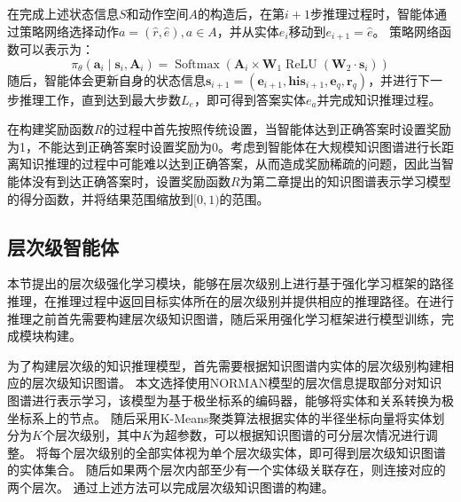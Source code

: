 \documentclass[algorithmlist, AutoFakeBold, AutoFakeSlant, figurelist, tablelist, nomlist, engineering]{seuthesix}
\begin{document}
在完成上述状态信息$S$和动作空间$A$的构造后，在第$i+1$步推理过程时，智能体通过策略网络选择动作$a = (\hat{r}, \hat{e}), a \in A$，并从实体$e_i$移动到$e_{i+1} = \hat{e}$。
策略网络函数可以表示为：
\begin{equation}
  \pi_\theta\left(\bm{a}_i \mid \bm{s}_i, \bm{A}_i\right) =\operatorname{Softmax}\left(\bm{A}_i \times \mathbf{W}_1 \operatorname{ReLU}\left(\mathbf{W}_2 \cdot \bm{s}_i\right)\right)
  \label{aaaaa}
\end{equation}
随后，智能体会更新自身的状态信息$\bm{s}_{i+1} = (\bm{e}_{i+1}, \bm{his}_{i+1}, \bm{e}_q, \bm{r}_q)$，并进行下一步推理工作，直到达到最大步数$L_e$，即可得到答案实体$e_a$并完成知识推理过程。

在构建奖励函数$R$的过程中首先按照传统设置，当智能体达到正确答案时设置奖励为1，不能达到正确答案时设置奖励为0。考虑到智能体在大规模知识图谱进行长距离知识推理的过程中可能难以达到正确答案，从而造成奖励稀疏的问题，因此当智能体没有到达正确答案时，设置奖励函数$R$为第二章提出的知识图谱表示学习模型的得分函数，并将结果范围缩放到$[0, 1)$的范围。

\subsection{层次级智能体}
本节提出的层次级强化学习模块，能够在层次级别上进行基于强化学习框架的路径推理，在推理过程中返回目标实体所在的层次级别并提供相应的推理路径。在进行推理之前首先需要构建层次级知识图谱，随后采用强化学习框架进行模型训练，完成模块构建。

为了构建层次级的知识推理模型，首先需要根据知识图谱内实体的层次级别构建相应的层次级知识图谱。
本文选择使用NORMAN模型的层次信息提取部分对知识图谱进行表示学习，该模型为基于极坐标系的编码器，能够将实体和关系转换为极坐标系上的节点。
随后采用K-Means聚类算法根据实体的半径坐标向量将实体划分为$K$个层次级别，其中$K$为超参数，可以根据知识图谱的可分层次情况进行调整。
将每个层次级别的全部实体视为单个层次级实体，即可得到层次级知识图谱的实体集合。
随后如果两个层次内部至少有一个实体级关联存在，则连接对应的两个层次。
通过上述方法可以完成层次级知识图谱的构建。
\end{document}
